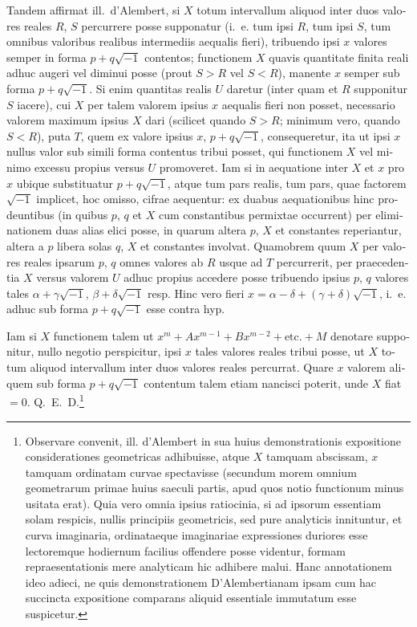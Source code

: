 \documentclass[12pt,a4paper]{article}
\begin{document}
\begin{otherlanguage}{latin}
Tandem affirmat ill.~d'Alembert, si $X$ totum intervallum aliquod inter duos valores reales $R$, $S$ percurrere posse supponatur (i.~e. tum ipsi $R$, tum ipsi $S$, tum omnibus valoribus realibus intermediis aequalis fieri), tribuendo ipsi $x$ valores semper in forma $p+q\sqrt{-1}$ contentos; functionem $X$ quavis quantitate finita reali adhuc augeri vel diminui posse (prout $S>R$ vel $S<R$), manente $x$ semper sub forma $p+q\sqrt{-1}$. Si enim quantitas realis $U$ daretur (inter quam et $R$ supponitur $S$ iacere), cui $X$ per talem valorem ipsius $x$ aequalis fieri non posset, necessario valorem maximum ipsius $X$ dari (scilicet quando $S>R$; minimum vero, quando $S<R$), puta $T$, quem ex valore ipsius $x$, $p+q\sqrt{-1}$, consequeretur, ita ut ipsi $x$ nullus valor sub simili forma contentus tribui posset, qui functionem $X$ vel minimo excessu propius versus $U$ promoveret. Iam si in aequatione inter $X$ et $x$ pro $x$ ubique substituatur $p+q\sqrt{-1}$, atque tum pars realis, tum pars, quae factorem $\sqrt{-1}$ implicet, hoc omisso, cifrae aequentur: ex duabus aequationibus hinc prodeuntibus (in quibus $p$, $q$ et $X$ cum constantibus permixtae occurrent) per eliminationem duas alias elici posse, in quarum altera $p$, $X$ et constantes reperiantur, altera a $p$ libera solas $q$, $X$ et constantes involvat. Quamobrem quum $X$ per valores reales ipsarum $p$, $q$ omnes valores ab $R$ usque ad $T$ percurrerit, per praecedentia $X$ versus valorem $U$ adhuc propius accedere posse tribuendo ipsius $p$, $q$ valores tales $\alpha+\gamma\sqrt{-1}$, $\beta+\delta\sqrt{-1}$ resp. Hinc vero fieri $x=\alpha-\delta+(\gamma+\delta)\sqrt{-1}$, i.~e. adhuc sub forma $p+q\sqrt{-1}$ esse contra hyp.

Iam si $X$ functionem talem ut $x^{m}+Ax^{m-1}+Bx^{m-2}+\text{etc.}+M$ denotare supponitur, nullo negotio perspicitur, ipsi $x$ tales valores reales tribui posse, ut $X$ totum aliquod intervallum inter duos valores reales percurrat. Quare $x$ valorem aliquem sub forma $p+q\sqrt{-1}$ contentum talem etiam nancisci poterit, unde $X$ fiat $=0$. Q.~E.~D.\footnote{Observare convenit, ill. d'Alembert in sua huius demonstrationis expositione considerationes geometricas adhibuisse, atque $X$ tamquam abscissam, $x$ tamquam ordinatam curvae spectavisse (secundum morem omnium geometrarum primae huius saeculi partis, apud quos notio functionum minus usitata erat). Quia vero omnia ipsius ratiocinia, si ad ipsorum essentiam solam respicis, nullis principiis geometricis, sed pure analyticis innituntur, et curva imaginaria, ordinataeque imaginariae expressiones duriores esse lectoremque hodiernum facilius offendere posse videntur, formam repraesentationis mere analyticam hic adhibere malui. Hanc annotationem ideo adieci, ne quis demonstrationem D'Alembertianam ipsam cum hac succincta expositione comparans aliquid essentiale immutatum esse suspicetur.}


\end{otherlanguage}
\end{document}
